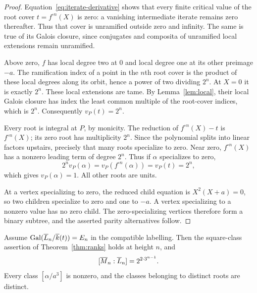 \begin{proof}
Equation~\eqref{eq:iterate-derivative} shows that every finite
critical value of the root cover $t=f^{\circ n}(X)$ is zero:
a vanishing intermediate iterate remains zero thereafter. Thus
that cover is unramified outside zero and infinity. The same is
true of its Galois closure, since conjugates and composita of
unramified local extensions remain unramified.

Above zero, $f$ has local degree two at $0$ and local degree one
at its other preimage $-a$. The ramification index of a point in
the $n$th root cover is the product of these local degrees along
its orbit, hence a power of two dividing $2^n$. At $X=0$ it is
exactly $2^n$. These local extensions are tame. By
Lemma~\ref{lem:local}, their local Galois closure has index the
least common multiple of the root-cover indices, which is $2^n$.
Consequently $v_P(t)=2^n$.

Every root is integral at $P$, by monicity. The reduction of
$f^{\circ n}(X)-t$ is $f^{\circ n}(X)$; its zero root has
multiplicity $2^n$. Since the polynomial splits into linear
factors upstairs, precisely that many roots specialize to zero.
Near zero, $f^{\circ n}(X)$ has a nonzero leading term of degree
$2^n$. Thus if $\alpha$ specializes to zero,
\[
 2^n v_P(\alpha)=v_P(f^{\circ n}(\alpha))=v_P(t)=2^n,
\]
which gives $v_P(\alpha)=1$. All other roots are units.

At a vertex specializing to zero, the reduced child equation is
$X^2(X+a)=0$, so two children specialize to zero and one to
$-a$. A vertex specializing to a nonzero value has no zero child.
The zero-specializing vertices therefore form a binary subtree,
and the asserted parity alternatives follow.
\end{proof}

\begin{proposition}\label{prop:kummer}
Assume $\operatorname{Gal}(\overline{L}_n/\overline{k}(t))=E_n$ in the compatible labelling.
Then the square-class assertion of Theorem~\ref{thm:ranks} holds
at height $n$, and
\[
 [\overline{M}_n:\overline{L}_n]=2^{2\cdot3^{n-1}}.
\]
Every class $[\alpha/a^3]$ is nonzero, and the classes belonging
to distinct roots are distinct.
\end{proposition}

